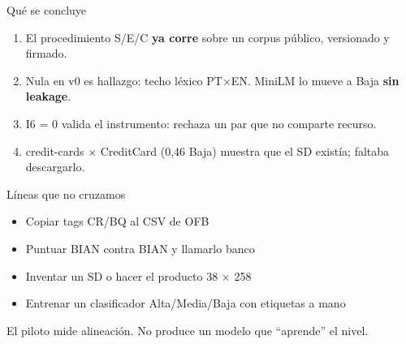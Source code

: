 \documentclass[aspectratio=169,12pt]{beamer}
\begin{document}
\begin{frame}[t]{Qué se concluye}
\vspace{0.2em}
{\small
\begin{enumerate}\itemsep0.55em
  \item El procedimiento S/E/C \textbf{ya corre} sobre un corpus público, versionado y firmado.
  \item Nula en v0 es hallazgo: techo léxico PT$\times$EN. MiniLM lo mueve a Baja \textbf{sin leakage}.
  \item I6 = 0 valida el instrumento: rechaza un par que no comparte recurso.
  \item credit-cards $\times$ CreditCard (0,46 Baja) muestra que el SD existía; faltaba descargarlo.
\end{enumerate}}
\end{frame}

\begin{frame}[t]{Líneas que no cruzamos}
\vspace{0.25em}
{\small
\begin{itemize}\itemsep0.55em
  \item Copiar tags CR/BQ al CSV de OFB
  \item Puntuar BIAN contra BIAN y llamarlo banco
  \item Inventar un SD o hacer el producto 38 $\times$ 258
  \item Entrenar un clasificador Alta/Media/Baja con etiquetas a mano
\end{itemize}}
\vspace{0.45em}
{\small El piloto mide alineación. No produce un modelo que ``aprende'' el nivel.}
\end{frame}
\end{document}
